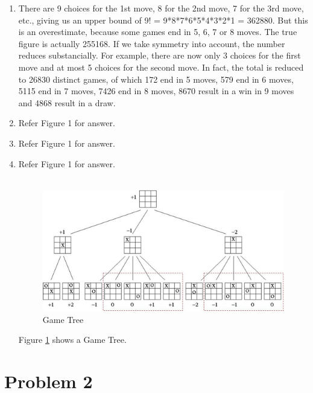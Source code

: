\documentclass[12pt]{article}
\begin{document}
\begin{enumerate}[label=(\alph*)]
  \item  There are 9 choices for the 1st move, 8 for the 2nd move, 7 for the 3rd move, etc., giving us an upper bound of 9! = 9*8*7*6*5*4*3*2*1 = 362880. But this is an overestimate, because some games end in 5, 6, 7 or 8 moves. The true ﬁgure is actually 255168. If we take symmetry into account, the number reduces substancially. For example, there are now only 3 choices for the ﬁrst move and at most 5 choices for the second move. In fact, the total is reduced to 26830 distinct games, of which 172 end in 5 moves, 579 end in 6 moves, 5115 end in 7 moves, 7426 end in 8 moves, 8670 result in a win in 9 moves and 4868 result in a draw.

\item Refer Figure 1 for answer.

\item Refer Figure 1 for answer.

\item Refer Figure 1 for answer.
\\\\
\begin{figure}
  \includegraphics[width=\linewidth]{GameTree.png}
  \caption{Game Tree}
  \label{fig: Game_Tree}
\end{figure}

Figure \ref{fig: Game_Tree} shows a Game Tree.


\end{enumerate}
\section*{Problem 2}
\end{document}

